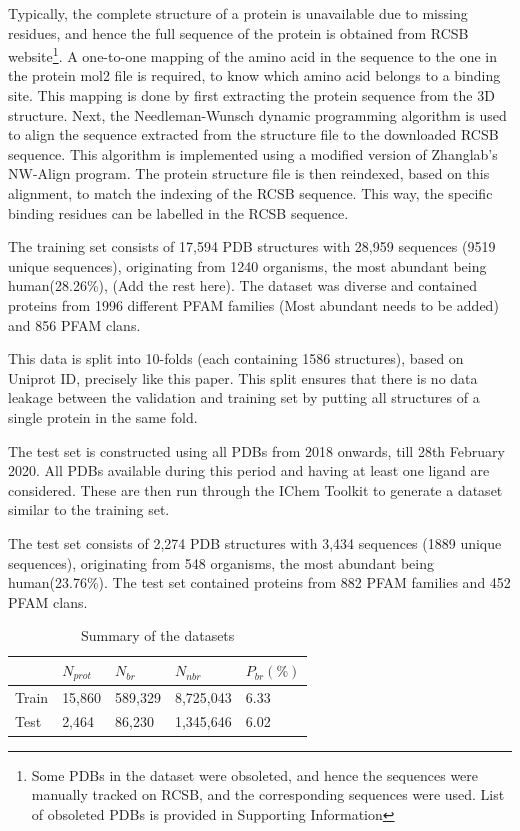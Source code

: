 \documentclass[journal=jacsat,manuscript=article]{achemso}
\begin{document}
Typically, the complete structure of a protein is unavailable due to missing residues, and hence the full sequence of the protein is obtained from RCSB \cite{burley2019rcsb} website\footnote{Some PDBs in the dataset were obsoleted, and hence the sequences were manually tracked on RCSB, and the corresponding sequences were used. List of obsoleted PDBs is provided in Supporting Information}. A one-to-one mapping of the amino acid in the sequence to the one in the protein mol2 file is required, to know which amino acid belongs to a binding site. This mapping is done by first extracting the protein sequence from the 3D structure. Next, the Needleman-Wunsch dynamic programming algorithm is used to align the sequence extracted from the structure file to the downloaded RCSB sequence. This algorithm is implemented using a modified version of Zhanglab's NW-Align program\cite{NWAlign}. The protein structure file is then reindexed, based on this alignment, to match the indexing of the RCSB sequence. This way, the specific binding residues can be labelled in the RCSB sequence.


The training set consists of 17,594 PDB structures with 28,959 sequences (9519 unique sequences), originating from 1240 organisms, the most abundant being human(28.26\%), (Add the rest here). The dataset was diverse and contained proteins from 1996 different PFAM families (Most abundant needs to be added) and 856 PFAM clans.

This data is split into 10-folds (each containing 1586 structures), based on Uniprot ID, precisely like this paper\cite{stepniewska2020improving}. This split ensures that there is no data leakage between the validation and training set by putting all structures of a single protein in the same fold.

The test set is constructed using all PDBs from 2018 onwards, till 28th February 2020. All PDBs available during this period and having at least one ligand are considered. These are then run through the IChem Toolkit \cite{da2018ichem} to generate a dataset similar to the training set.

The test set consists of 2,274 PDB structures with 3,434 sequences (1889 unique sequences), originating from 548 organisms, the most abundant being human(23.76\%). The test set contained proteins from 882 PFAM families and 452 PFAM clans.

\begin{table}
    \centering
    \begin{tabular}{| p{2.75cm} | p{2.75cm} | p{2.75cm} | p{2.75cm} | p{2.75cm} |}
        \hline
              & $N_{prot}$ & $N_{br}$ & $N_{nbr}$ & $P_{br}(\%)$ \\
        \hline
        Train & 15,860     & 589,329  & 8,725,043 & 6.33         \\
        Test  & 2,464      & 86,230   & 1,345,646 & 6.02         \\
        \hline
    \end{tabular}
    \caption{Summary of the datasets}
    \label{table:1}
\end{table}
\end{document}
